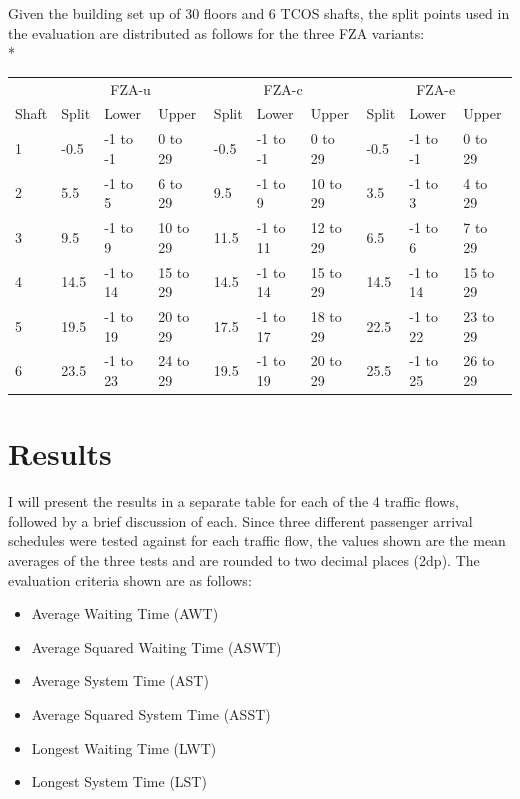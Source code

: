 \documentclass{UoYCSproject}
\begin{document}
Given the building set up of 30 floors and 6 TCOS shafts, the split points used in the evaluation are distributed as follows for the three FZA variants:\\*
\begin{tabular}{l || l | l | l || l | l | l || l | l | l}
		& \multicolumn{3}{c||}{FZA-u} & \multicolumn{3}{c||}{FZA-c} & \multicolumn{3}{c}{FZA-e} \\
	Shaft & Split & Lower & Upper & Split & Lower & Upper & Split & Lower & Upper \\
	\hline
	1	& -0.5	& -1 to -1	& 0 to 29	& -0.5	& -1 to -1	& 0 to 29	& -0.5	& -1 to -1	& 0 to 29 \\
	2	& 5.5	& -1 to 5	& 6 to 29	& 9.5	& -1 to 9	& 10 to 29	& 3.5	& -1 to 3	& 4 to 29 \\
	3	& 9.5	& -1 to 9	& 10 to 29	& 11.5	& -1 to 11	& 12 to 29	& 6.5	& -1 to 6	& 7 to 29 \\
	4	& 14.5	& -1 to 14	& 15 to 29	& 14.5	& -1 to 14	& 15 to 29	& 14.5	& -1 to 14	& 15 to 29 \\
	5	& 19.5	& -1 to 19	& 20 to 29	& 17.5	& -1 to 17	& 18 to 29	& 22.5	& -1 to 22	& 23 to 29 \\
	6	& 23.5	& -1 to 23	& 24 to 29	& 19.5	& -1 to 19	& 20 to 29	& 25.5	& -1 to 25	& 26 to 29
\end{tabular}

\section{Results}
\label{tcosresults}

I will present the results in a separate table for each of the 4 traffic flows, followed by a brief discussion of each.  Since three different passenger arrival schedules were tested against for each traffic flow, the values shown are the mean averages of the three tests and are rounded to two decimal places (2dp).  The evaluation criteria shown are as follows:
\begin{itemize}
	\item Average Waiting Time (AWT)
	\item Average Squared Waiting Time (ASWT)
	\item Average System Time (AST)
	\item Average Squared System Time (ASST)
	\item Longest Waiting Time (LWT)
	\item Longest System Time (LST)
\end{itemize}
\end{document}
